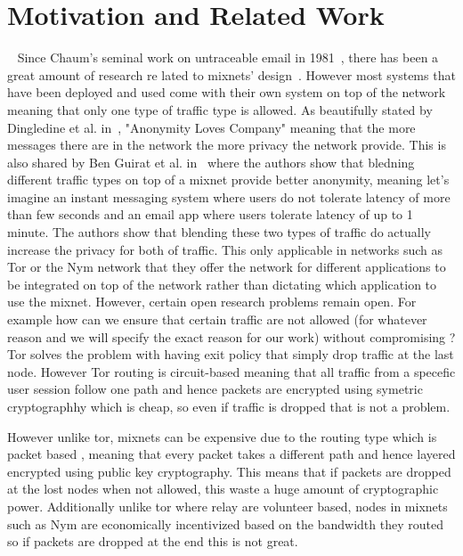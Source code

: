 \section{Motivation and Related Work}~\label{sec:related}
Since Chaum’s seminal work on untraceable email in 1981~\cite{chaum-mix}, there has been a great amount of research re
lated to mixnets' design~\cite{piotrowska2017loopix, van2015vuvuzela, kwon2020xrd, lazar2018karaoke, cottrell1995mixmaster, alexopoulos2017MCMIX, chaum2016cmix, chaum-mix, danezis2003mixminion}. However most systems that have been deployed and used come with their own system on top of the network meaning that only one type of traffic type is allowed. As beautifully stated by Dingledine et al. in~\cite{dingledine2006anonymity}, "Anonymity Loves Company" meaning that the more messages there are in the network the more privacy the network provide. This is also shared by Ben Guirat et al. in~\cite{benguirat2023blending} where the authors show that bledning different traffic types on top of a mixnet provide better anonymity, meaning let's imagine an instant messaging system where users do not tolerate latency of more than few seconds and an email app where users tolerate latency of up to 1 minute. The authors show that blending these two types of traffic do actually increase the privacy for both of traffic. This only applicable in networks such as Tor or the Nym network that they offer the network for different applications to be integrated on top of the network rather than dictating which application to use the mixnet.
However, certain open research problems remain open. For example how can we ensure that certain traffic are not allowed (for whatever reason and we will specify the exact reason for our work) without compromising ?
Tor solves the problem with having exit policy that simply drop traffic at the last node. However Tor routing is circuit-based meaning that all traffic from a specefic user session follow one path and hence packets are encrypted using symetric cryptographhy which is cheap, so even if traffic is dropped that is not a problem.

However unlike tor, mixnets can be expensive due to the routing type which is packet based , meaning that every packet takes a different path and hence layered encrypted using public key cryptography. This means that if packets are dropped at the lost nodes when not allowed, this waste a huge amount of cryptographic power. Additionally unlike tor where relay are volunteer based, nodes in mixnets such as Nym are economically incentivized based on the bandwidth they routed so if packets are dropped at the end this is not great.
